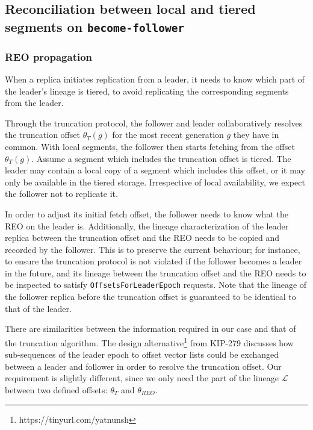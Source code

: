 \documentclass{article}
\newcommand*\circled[1]{\tikz[baseline=(char.base)]{
		\node[shape=circle,draw,inner sep=1pt] (char) {#1};}}
\begin{document}
\newpage
\subsection{Reconciliation between local and tiered segments on \texttt{become-follower}}

\subsubsection{REO propagation}

When a replica initiates replication from a leader, it needs to know which part of the leader's lineage is tiered, to avoid replicating the corresponding segments from the leader.

Through the truncation protocol, the follower and leader collaboratively resolves the truncation offset $\theta_T(g)$ for the most recent generation $g$ they have in common. With local segments, the follower then starts fetching from the offset $\theta_T(g)$. Assume a segment which includes the truncation offset is tiered. The leader may contain a local copy of a segment which includes this offset, or it may only be available in the tiered storage. Irrespective of local availability, we expect the follower not to replicate it.

In order to adjust its initial fetch offset, the follower needs to know what the REO on the leader is. Additionally, the lineage characterization of the leader replica between the truncation offset and the REO needs to be copied and recorded by the follower. This is to preserve the current behaviour; for instance, to ensure the truncation protocol is not violated if the follower becomes a leader in the future, and its lineage between the truncation offset and the REO needs to be inspected to satisfy \texttt{OffsetsForLeaderEpoch} requests. Note that the lineage of the follower replica before the truncation offset is guaranteed to be identical to that of the leader.

There are similarities between the information required in our case and that of the truncation algorithm. The design alternative\footnote{https://tinyurl.com/yatnunsh} \circled{2} from KIP-279 \cite{KIP279} discusses how sub-sequences of the leader epoch to offset vector lists could be exchanged between a leader and follower in order to resolve the truncation offset. Our requirement is slightly different, since we only need the part of the lineage $\mathcal{L}$ between two defined offsets: $\theta_{T}$ and $\theta_{REO}$.
\end{document}
